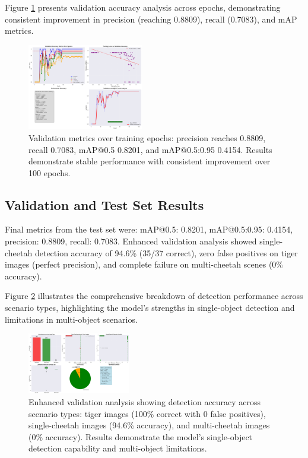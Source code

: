 \documentclass[conference]{IEEEtran}
\begin{document}
Figure \ref{fig:validation_curves} presents validation accuracy analysis across epochs, demonstrating consistent improvement in precision (reaching 0.8809), recall (0.7083), and mAP metrics.

\begin{figure}[htbp]
\centerline{\includegraphics[width=0.45\textwidth]{validation_curves.png}}
\caption{Validation metrics over training epochs: precision reaches 0.8809, recall 0.7083, mAP@0.5 0.8201, and mAP@0.5:0.95 0.4154. Results demonstrate stable performance with consistent improvement over 100 epochs.}
\label{fig:validation_curves}
\end{figure}

\subsection{Validation and Test Set Results}

Final metrics from the test set were: mAP@0.5: 0.8201, mAP@0.5:0.95: 0.4154, precision: 0.8809, recall: 0.7083. Enhanced validation analysis showed single-cheetah detection accuracy of 94.6\% (35/37 correct), zero false positives on tiger images (perfect precision), and complete failure on multi-cheetah scenes (0\% accuracy).

Figure \ref{fig:enhanced_validation} illustrates the comprehensive breakdown of detection performance across scenario types, highlighting the model's strengths in single-object detection and limitations in multi-object scenarios.

\begin{figure}[htbp]
\centerline{\includegraphics[width=0.4\textwidth]{enhanced_validation.png}}
\caption{Enhanced validation analysis showing detection accuracy across scenario types: tiger images (100\% correct with 0 false positives), single-cheetah images (94.6\% accuracy), and multi-cheetah images (0\% accuracy). Results demonstrate the model's single-object detection capability and multi-object limitations.}
\label{fig:enhanced_validation}
\end{figure}
\end{document}
